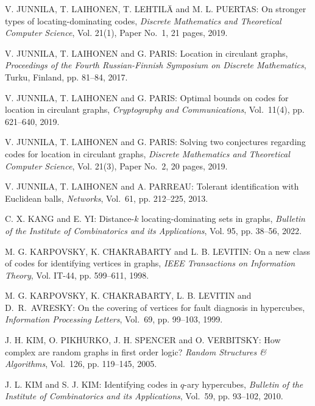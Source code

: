 \begin{thebibliography}{999}
V. JUNNILA, T. LAIHONEN, T. LEHTIL\"A and M. L. PUERTAS: On stronger types of locating-dominating codes, {\it Discrete Mathematics and Theoretical Computer Science}, Vol. 21(1), Paper No.~1, 21 pages, 2019.

V. JUNNILA, T. LAIHONEN and G. PARIS: Location in circulant graphs, {\it Proceedings of the Fourth Russian-Finnish Symposium on Discrete Mathematics}, Turku, Finland, pp. 81--84, 2017.

V. JUNNILA, T. LAIHONEN and G. PARIS: Optimal bounds on codes for location in circulant graphs, {\it Cryptography and Communications}, Vol.~11(4), pp. 621--640, 2019.

V. JUNNILA, T. LAIHONEN and G. PARIS: Solving two conjectures regarding codes for location in circulant graphs, {\it Discrete Mathematics and Theoretical Computer Science}, Vol. 21(3), Paper No.~2, 20 pages, 2019.

V. JUNNILA, T. LAIHONEN and A. PARREAU: Tolerant identification with Euclidean balls, {\it Networks}, Vol.~61, pp. 212--225, 2013.

C. X. KANG and E. YI: Distance-$k$ locating-dominating sets in graphs, {\it Bulletin of the Institute of Combinatorics and its Applications}, Vol. 95, pp. 38--56, 2022.

%
M. G. KARPOVSKY, K. CHAKRABARTY and L. B. LEVITIN: On a new class of codes for identifying vertices in graphs, {\it IEEE Transactions on Information Theory}, Vol. IT-44, pp. 599--611, 1998.

M. G. KARPOVSKY, K. CHAKRABARTY, L. B. LEVITIN and D.~R.~AVRESKY: On the covering of vertices for fault diagnosis in hypercubes, {\it Information Processing Letters}, Vol.~69, pp. 99--103, 1999.
%

J. H. KIM, O. PIKHURKO, J. H. SPENCER and O. VERBITSKY: How complex are random graphs in first order logic? {\it Random Structures \& Algorithms}, Vol.~126, pp. 119--145, 2005.

J. L. KIM and S. J. KIM: Identifying codes in $q$-ary hypercubes, {\it Bulletin of the Institute of Combinatorics and its Applications}, Vol.~59, pp. 93--102, 2010.


\end{thebibliography}
